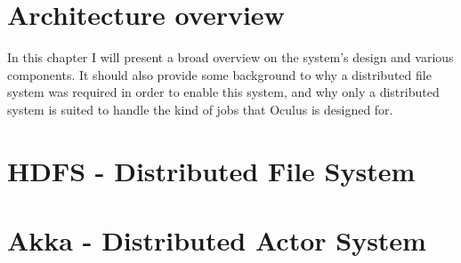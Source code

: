 \section{Architecture overview}
In this chapter I will present a broad overview on the system's design and various components.
It should also provide some background to why a distributed file system was required in order to enable this system,
and why only a distributed system is suited to handle the kind of jobs that Oculus is designed for.

\section{HDFS - Distributed File System}


\section{Akka - Distributed Actor System}

